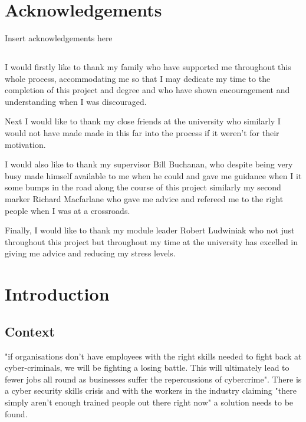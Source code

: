 \documentclass[12pt,a4paper]{article}
\begin{document}
\tableofcontents %
\newpage

\listoftables
\newpage

\listoffigures
\newpage

\section*{Acknowledgements}
Insert acknowledgements here
\subsection*{}
	I would firstly like to thank my family who have supported me throughout this whole process, accommodating me so that I may dedicate my time to the completion of this project and degree and who have shown encouragement and understanding when I was discouraged. 
	
	Next I would like to thank my close friends at the university who similarly I would not have made made in this far into the process if it weren't for their motivation. 
	
	I would also like to thank my supervisor Bill Buchanan, who despite being very busy made himself available to me when he could and gave me guidance when I it some bumps in the road along the course of this project similarly my second marker Richard Macfarlane who gave me advice and refereed me to the right people when I was at a crossroads. 
	
	Finally, I would like to thank my module leader Robert Ludwiniak who not just throughout this project but throughout my time at the university has excelled in giving me advice and reducing my stress levels.
\newpage

\setcounter{page}{1}

\section{Introduction}  
\subsection{Context} 
"if organisations don't have employees with the right skills needed to fight back at cyber-criminals, we will be fighting a losing battle. This will ultimately lead to fewer jobs all round as businesses suffer the repercussions of cybercrime". There is a cyber security skills crisis and with the workers in the industry claiming "there simply aren't enough trained people out there right now" \cite{caldwell2013plugging} a solution needs to be found.  
\end{document}
